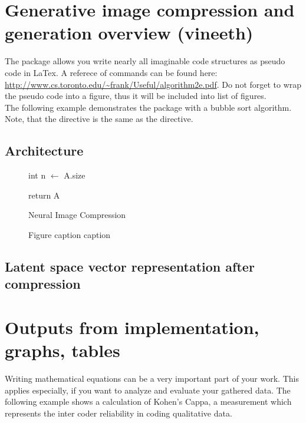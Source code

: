\section{Generative image compression and generation overview (vineeth)}


The package  allows you write nearly all imaginable code structures as pseudo code in LaTex. A referece of commands can be found here: \url{http://www.cs.toronto.edu/~frank/Useful/algorithm2e.pdf}. Do not forget to wrap the pseudo code into a figure, thus it will be included into list of figures.\\

The following example demonstrates the package with a bubble sort algorithm. Note, that the directive  is the same as the  directive.

\subsection{Architecture}

\begin{figure}[H]
\begin{algorithm}[H]

int n $\leftarrow$ A.size 



return A
\caption{Neural Image Compression}
\end{algorithm}
\caption[TBC]{Figure caption caption}
\end{figure}

\subsection{Latent space vector representation after compression}

\newpage
\section{Outputs from implementation, graphs, tables}

Writing mathematical equations can be a very important part of your work. This applies especially, if you want to analyze and evaluate your gathered data. The following example shows a calculation of Kohen's Cappa, a measurement which represents the inter coder reliability in coding qualitative data.\\

